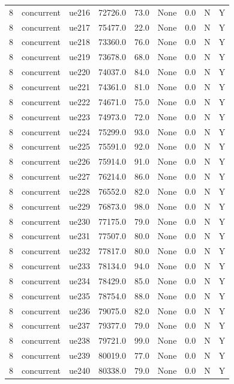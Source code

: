 \begin{table}[ht]
\begin{tabular}{|c|c|c|c|c|c|c|c|c|}
8 & concurrent & ue216 & 72726.0 & 73.0 & None & 0.0 & N & Y \\
8 & concurrent & ue217 & 75477.0 & 22.0 & None & 0.0 & N & Y \\
8 & concurrent & ue218 & 73360.0 & 76.0 & None & 0.0 & N & Y \\
8 & concurrent & ue219 & 73678.0 & 68.0 & None & 0.0 & N & Y \\
8 & concurrent & ue220 & 74037.0 & 84.0 & None & 0.0 & N & Y \\
8 & concurrent & ue221 & 74361.0 & 81.0 & None & 0.0 & N & Y \\
8 & concurrent & ue222 & 74671.0 & 75.0 & None & 0.0 & N & Y \\
8 & concurrent & ue223 & 74973.0 & 72.0 & None & 0.0 & N & Y \\
8 & concurrent & ue224 & 75299.0 & 93.0 & None & 0.0 & N & Y \\
8 & concurrent & ue225 & 75591.0 & 92.0 & None & 0.0 & N & Y \\
8 & concurrent & ue226 & 75914.0 & 91.0 & None & 0.0 & N & Y \\
8 & concurrent & ue227 & 76214.0 & 86.0 & None & 0.0 & N & Y \\
8 & concurrent & ue228 & 76552.0 & 82.0 & None & 0.0 & N & Y \\
8 & concurrent & ue229 & 76873.0 & 98.0 & None & 0.0 & N & Y \\
8 & concurrent & ue230 & 77175.0 & 79.0 & None & 0.0 & N & Y \\
8 & concurrent & ue231 & 77507.0 & 80.0 & None & 0.0 & N & Y \\
8 & concurrent & ue232 & 77817.0 & 80.0 & None & 0.0 & N & Y \\
8 & concurrent & ue233 & 78134.0 & 94.0 & None & 0.0 & N & Y \\
8 & concurrent & ue234 & 78429.0 & 85.0 & None & 0.0 & N & Y \\
8 & concurrent & ue235 & 78754.0 & 88.0 & None & 0.0 & N & Y \\
8 & concurrent & ue236 & 79075.0 & 82.0 & None & 0.0 & N & Y \\
8 & concurrent & ue237 & 79377.0 & 79.0 & None & 0.0 & N & Y \\
8 & concurrent & ue238 & 79721.0 & 99.0 & None & 0.0 & N & Y \\
8 & concurrent & ue239 & 80019.0 & 77.0 & None & 0.0 & N & Y \\
8 & concurrent & ue240 & 80338.0 & 79.0 & None & 0.0 & N & Y \\

\end{tabular}
\end{table}
